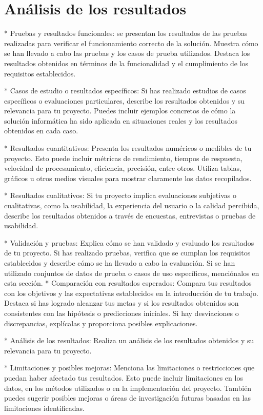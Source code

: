 \section{Análisis de los resultados}

* Pruebas y resultados funcionales: se presentan los resultados de las pruebas realizadas para verificar el
funcionamiento correcto de la solución. Muestra cómo se han llevado a cabo las pruebas y los casos de prueba
utilizados. Destaca los resultados obtenidos en términos de la funcionalidad y el cumplimiento de los requisitos
establecidos.

* Casos de estudio o resultados específicos: Si has realizado estudios de casos específicos o evaluaciones particulares,
describe los resultados obtenidos y su relevancia para tu proyecto. Puedes incluir ejemplos concretos de cómo la
solución informática ha sido aplicada en situaciones reales y los resultados obtenidos en cada caso.

* Resultados cuantitativos: Presenta los resultados numéricos o medibles de tu proyecto. Esto puede incluir métricas de
rendimiento, tiempos de respuesta, velocidad de procesamiento, eficiencia, precisión, entre otros. Utiliza tablas,
gráficos u otros medios visuales para mostrar claramente los datos recopilados.

* Resultados cualitativos: Si tu proyecto implica evaluaciones subjetivas o cualitativas, como la usabilidad, la
experiencia del usuario o la calidad percibida, describe los resultados obtenidos a través de encuestas, entrevistas o
pruebas de usabilidad.

* Validación y pruebas: Explica cómo se han validado y evaluado los resultados de tu proyecto. Si has realizado pruebas,
verifica que se cumplan los requisitos establecidos y describe cómo se ha llevado a cabo la evaluación. Si se han
utilizado conjuntos de datos de prueba o casos de uso específicos, menciónalos en esta sección.
* Comparación con resultados esperados: Compara tus resultados con los objetivos y las expectativas establecidos en la
introducción de tu trabajo. Destaca si has logrado alcanzar tus metas y si los resultados obtenidos son consistentes
con las hipótesis o predicciones iniciales. Si hay desviaciones o discrepancias, explícalas y proporciona posibles
explicaciones.

* Análisis de los resultados: Realiza un análisis de los resultados obtenidos y su relevancia para tu proyecto.

* Limitaciones y posibles mejoras: Menciona las limitaciones o restricciones que puedan haber afectado tus resultados.
Esto puede incluir limitaciones en los datos, en los métodos utilizados o en la implementación del proyecto. También
puedes sugerir posibles mejoras o áreas de investigación futuras basadas en las limitaciones identificadas.
